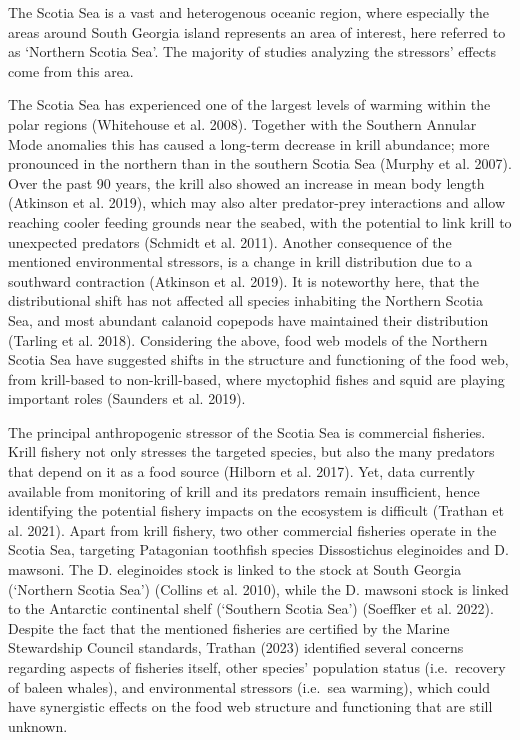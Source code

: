\documentclass[
]{article}
\begin{document}
The Scotia Sea is a vast and heterogenous oceanic region, where
especially the areas around South Georgia island represents an area of
interest, here referred to as `Northern Scotia Sea'. The majority of
studies analyzing the stressors' effects come from this area.

The Scotia Sea has experienced one of the largest levels of warming
within the polar regions (Whitehouse et al. 2008). Together with the
Southern Annular Mode anomalies this has caused a long-term decrease in
krill abundance; more pronounced in the northern than in the southern
Scotia Sea (Murphy et al. 2007). Over the past 90 years, the krill also
showed an increase in mean body length (Atkinson et al. 2019), which may
also alter predator-prey interactions and allow reaching cooler feeding
grounds near the seabed, with the potential to link krill to unexpected
predators (Schmidt et al. 2011). Another consequence of the mentioned
environmental stressors, is a change in krill distribution due to a
southward contraction (Atkinson et al. 2019). It is noteworthy here,
that the distributional shift has not affected all species inhabiting
the Northern Scotia Sea, and most abundant calanoid copepods have
maintained their distribution (Tarling et al. 2018). Considering the
above, food web models of the Northern Scotia Sea have suggested shifts
in the structure and functioning of the food web, from krill-based to
non-krill-based, where myctophid fishes and squid are playing important
roles (Saunders et al. 2019).

The principal anthropogenic stressor of the Scotia Sea is commercial
fisheries. Krill fishery not only stresses the targeted species, but
also the many predators that depend on it as a food source (Hilborn et
al. 2017). Yet, data currently available from monitoring of krill and
its predators remain insufficient, hence identifying the potential
fishery impacts on the ecosystem is difficult (Trathan et al. 2021).
Apart from krill fishery, two other commercial fisheries operate in the
Scotia Sea, targeting Patagonian toothfish species Dissostichus
eleginoides and D. mawsoni. The D. eleginoides stock is linked to the
stock at South Georgia (`Northern Scotia Sea') (Collins et al. 2010),
while the D. mawsoni stock is linked to the Antarctic continental shelf
(`Southern Scotia Sea') (Soeffker et al. 2022). Despite the fact that
the mentioned fisheries are certified by the Marine Stewardship Council
standards, Trathan (2023) identified several concerns regarding aspects
of fisheries itself, other species' population status (i.e.~recovery of
baleen whales), and environmental stressors (i.e.~sea warming), which
could have synergistic effects on the food web structure and functioning
that are still unknown.
\end{document}
